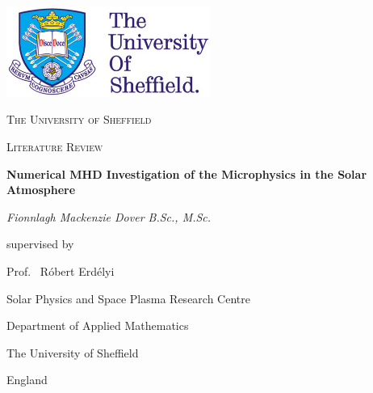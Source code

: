 \documentclass[12pt,a4paper,twoside]{article}
\begin{document}
\begin{titlepage}
	\centering
	\includegraphics[width=0.5\textwidth]{logo_uni2.jpg}\par\vspace{1cm}
	{\scshape\LARGE The University of Sheffield \par}
	\vspace{1cm}
	{\scshape\Large Literature Review\par}
	\vspace{1.5cm}
	{\Large\bfseries Numerical MHD Investigation of the Microphysics in the Solar Atmosphere\par}
	\vspace{2cm}
	{\Large\itshape Fionnlagh Mackenzie Dover B.Sc., M.Sc.\par}
	\vfill
	\large supervised by\par
	\Large Prof.~ R\'{o}bert Erd\'{e}lyi\par
	\large Solar Physics and Space Plasma Research Centre\par 
	\large Department of Applied Mathematics\par
	\large The University of Sheffield\par
	\large England\par

	\vfill

\end{titlepage}
\setcounter{page}{0}
\end{document}
